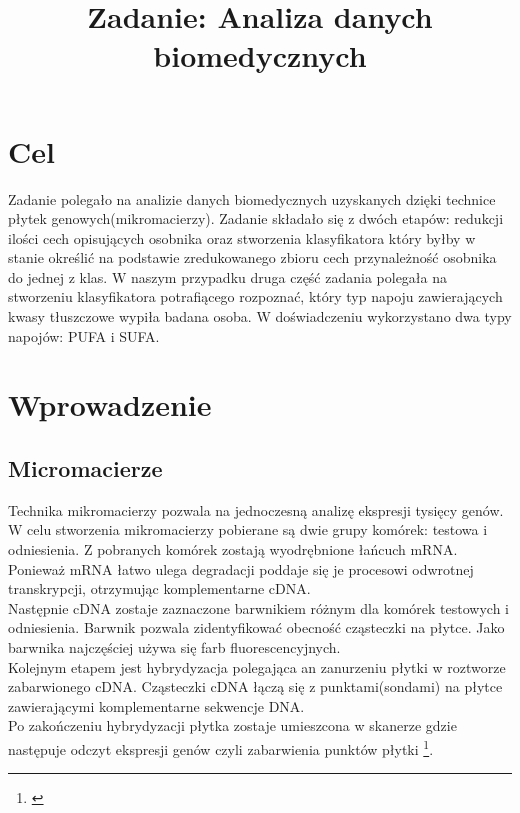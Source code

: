 \documentclass{classrep}
\author{
  \studentinfo{Leszek Wach}{169513} \and
  \studentinfo{Michał Janiszewski}{169485} \and
}
\title{Zadanie: Analiza danych biomedycznych}
\begin{document}
\maketitle

\section{Cel}
Zadanie polegało na analizie danych biomedycznych uzyskanych dzięki technice płytek genowych(mikromacierzy). Zadanie składało się z dwóch etapów: redukcji ilości cech opisujących osobnika oraz stworzenia klasyfikatora który byłby w stanie określić na podstawie zredukowanego zbioru cech przynależność osobnika do jednej z klas. W naszym przypadku druga część zadania polegała na stworzeniu klasyfikatora potrafiącego rozpoznać, który typ napoju zawierających kwasy tłuszczowe wypiła badana osoba. W doświadczeniu wykorzystano dwa typy napojów: PUFA i SUFA.

\section{Wprowadzenie}
\subsection{Micromacierze}
Technika mikromacierzy pozwala na jednoczesną analizę ekspresji tysięcy genów. W celu stworzenia mikromacierzy pobierane są dwie grupy komórek: testowa i odniesienia.
Z pobranych komórek zostają wyodrębnione łańcuch mRNA. Ponieważ mRNA łatwo ulega degradacji poddaje się je procesowi odwrotnej transkrypcji, otrzymując komplementarne cDNA.\\ \indent Następnie cDNA zostaje zaznaczone barwnikiem różnym dla komórek testowych i odniesienia. Barwnik pozwala zidentyfikować obecność cząsteczki na płytce. Jako barwnika najczęściej używa się farb fluorescencyjnych.\\
\indent Kolejnym etapem jest hybrydyzacja polegająca an zanurzeniu płytki w roztworze zabarwionego cDNA. Cząsteczki cDNA łączą się z punktami(sondami) na płytce zawierającymi komplementarne sekwencje DNA.\\
\indent Po zakończeniu hybrydyzacji płytka zostaje umieszcona w skanerze gdzie następuje odczyt ekspresji genów czyli zabarwienia punktów płytki \footnote{\cite{metodyklasyfikacji}}.
\end{document}
